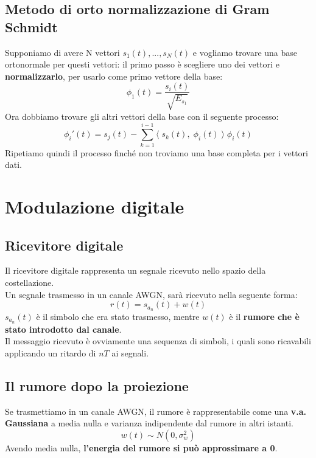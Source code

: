 \documentclass{article}
\begin{document}
\subsection{Metodo di orto normalizzazione di Gram Schmidt}
Supponiamo di avere N vettori $s_1(t),...,s_N(t)$ e vogliamo trovare una base ortonormale per questi vettori: il primo passo è scegliere uno dei vettori e \textbf{normalizzarlo}, per usarlo come primo vettore della base:
$$\phi_1(t)=\frac{s_i(t)}{\sqrt{E_{s_1}}}$$
Ora dobbiamo trovare gli altri vettori della base con il seguente processo:
$$\phi_i'(t)=s_j(t)-\sum_{k=1}^{i-1}\langle\;s_k(t),\;\phi_i(t)\;\rangle\;\phi_i(t)$$
Ripetiamo quindi il processo finché non troviamo una base completa per i vettori dati.









\newpage
\section{Modulazione digitale}

\subsection{Ricevitore digitale}
Il ricevitore digitale rappresenta un segnale ricevuto nello spazio della costellazione.\\
Un segnale trasmesso in un canale AWGN, sarà ricevuto nella seguente forma:
$$r(t)=s_{a_n}(t)+w(t)$$
$s_{a_n}(t)$ è il simbolo che era stato trasmesso, mentre $w(t)$ è il \textbf{rumore che è stato introdotto dal canale}.\\
Il messaggio ricevuto è ovviamente una sequenza di simboli, i quali sono ricavabili applicando un ritardo di $nT$ ai segnali.

\subsection{Il rumore dopo la proiezione}
Se trasmettiamo in un canale AWGN, il rumore è rappresentabile come una \textbf{v.a. Gaussiana} a media nulla e varianza indipendente dal rumore in altri istanti.
$$w(t)\sim N(0,\sigma_w^2)$$
Avendo media nulla, \textbf{l'energia del rumore si può approssimare a 0}.\\
\end{document}
